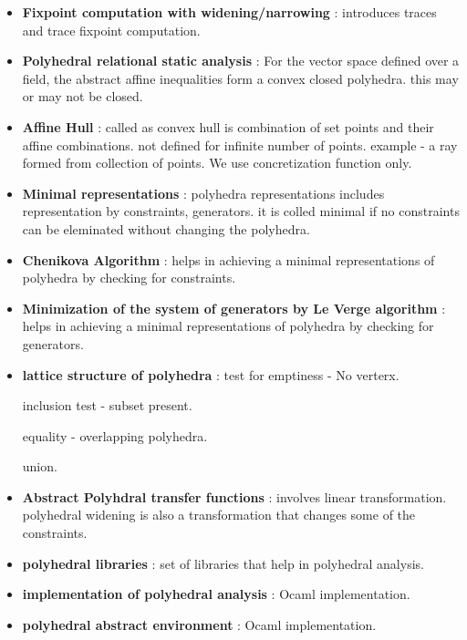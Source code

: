 \begin{itemize}
	\item{\textbf{Fixpoint computation with widening/narrowing} : introduces traces and trace fixpoint computation.
	}

	\item{\textbf{Polyhedral relational static analysis} : For the vector space defined over a field, the abstract affine inequalities form a convex closed polyhedra. this may or may not be closed.
	}

	\item{\textbf{Affine Hull} : called as convex hull is combination of set points and their affine combinations. not defined for infinite number of points. example -  a ray formed from collection of points. We use concretization function only. 
	}

	\item{\textbf{Minimal representations} : polyhedra representations includes representation by constraints, generators. it is colled minimal if no constraints can be eleminated without changing the polyhedra.
	}

	\item{\textbf{Chenikova Algorithm} : helps in achieving a minimal representations of polyhedra by checking for constraints.
	}

	\item{\textbf{Minimization of the system of generators by Le Verge algorithm} : helps in achieving a minimal representations of polyhedra by checking for generators.
	}

	\item{\textbf{lattice structure of polyhedra} : 
	test for emptiness - No verterx.

	inclusion test - subset present.

	equality - overlapping polyhedra.

	union.
	}

	\item{\textbf{Abstract Polyhdral transfer functions} : involves linear transformation. polyhedral widening is also a transformation that changes some of the constraints.
	}


	\item{\textbf{polyhedral libraries} : set of libraries that help in polyhedral analysis.
	}

	\item{\textbf{implementation of polyhedral analysis} : Ocaml implementation.
	}

	\item{\textbf{polyhedral abstract environment} : Ocaml implementation.
	}

\end{itemize}
